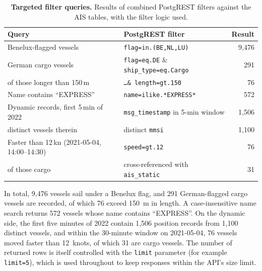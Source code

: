 \documentclass[10pt,a4paper]{article}
\begin{document}
\begin{table}[H]
\caption{\textbf{Targeted filter queries.} Results of combined PostgREST filters against the AIS tables, with the filter logic used.}
\label{tab:filter-queries}
\vspace{0.2cm}
\centering
\small
\begin{tabular}{@{}p{5.1cm}p{6.1cm}r@{}}
\toprule
{\bfseries Query} & {\bfseries PostgREST filter} & {\bfseries Result} \\
\midrule
Benelux-flagged vessels                 & \texttt{flag=in.(BE,NL,LU)}                       & 9,476 \\
German cargo vessels                    & \texttt{flag=eq.DE} \& \texttt{ship\_type=eq.Cargo} & 291 \\
\quad of those longer than 150\,m       & \texttt{\dots \& length=gt.150}                   & 76 \\
Name contains ``EXPRESS''               & \texttt{name=ilike.*EXPRESS*}                     & 572 \\
Dynamic records, first 5\,min of 2022   & \texttt{msg\_timestamp} in 5-min window           & 1,506 \\
\quad distinct vessels therein          & distinct \texttt{mmsi}                            & 1,100 \\
Faster than 12\,kn (2021-05-04, 14:00--14:30) & \texttt{speed=gt.12}                         & 76 \\
\quad of those cargo                    & cross-referenced with \texttt{ais\_static}        & 31 \\
\bottomrule
\end{tabular}
\end{table}

In total, 9,476 vessels sail under a Benelux flag, and 291 German-flagged cargo vessels
are recorded, of which 76 exceed 150~m in length. A case-insensitive name search returns
572 vessels whose name contains ``EXPRESS''. On the dynamic side, the first five minutes
of 2022 contain 1,506 position records from 1,100 distinct vessels, and within the
30-minute window on 2021-05-04, 76 vessels moved faster than 12~knots, of which 31 are
cargo vessels. The number of returned rows is itself controlled with the
\texttt{limit} parameter (for example \texttt{limit=5}), which is used throughout to
keep responses within the API's size limit.

\end{document}
